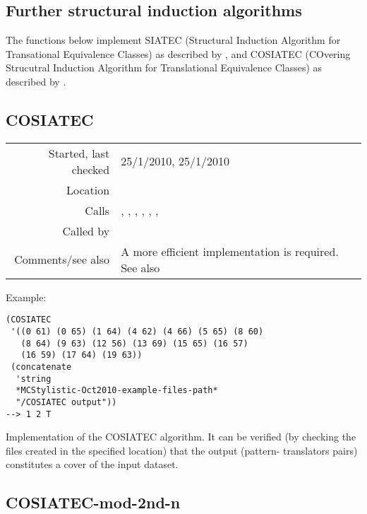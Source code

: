 \subsection{Further structural induction algorithms}\label{sec:further-structural-induction-algorithms}

The functions below implement SIATEC (Structural
Induction Algorithm for Transational Equivalence
Classes) as described by \citet{meredith2002}, and
COSIATEC (COvering Strucutral Induction Algorithm for
Translational Equivalence Classes) as described by 
\citet{forth2009,meredith2003}.


\subsection*{COSIATEC}\label{fun:COSIATEC}

\vspace{0.3cm}
\begin{tabular}{r|p{8cm}}
Started, last checked & 25/1/2010, 25/1/2010 \\
Location & \nameref{sec:further-structural-induction-algorithms} \\
Calls & \nameref{fun:argmax-of-threeCs}, \nameref{fun:read-from-file}, \nameref{fun:remove-pattern-occurrences-from-dataset}, \nameref{fun:SIA-reflected-for-COSIATEC}, \nameref{fun:SIATEC}, \nameref{fun:threeCs-pattern-translators-pairs}, \nameref{fun:write-to-file} \\
Called by & \\
Comments/see also & A more efficient implementation is required. See also \nameref{fun:COSIATEC-mod-2nd-n}
\end{tabular}

\vspace{0.5cm}
\noindent Example:
\begin{verbatim}
(COSIATEC
 '((0 61) (0 65) (1 64) (4 62) (4 66) (5 65) (8 60)
   (8 64) (9 63) (12 56) (13 69) (15 65) (16 57)
   (16 59) (17 64) (19 63))
 (concatenate
  'string
  *MCStylistic-Oct2010-example-files-path*
  "/COSIATEC output"))
--> 1 2 T
\end{verbatim}

\noindent Implementation of the COSIATEC algorithm. It
can be verified (by checking the files created in the
specified location) that the output (pattern-
translators pairs) constitutes a cover of the input
dataset.


\subsection*{COSIATEC-mod-2nd-n}\label{fun:COSIATEC-mod-2nd-n}

